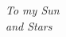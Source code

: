 
\thispagestyle{plain}
\mbox{}

\vspace{2in}

\begin{center}
	{\em
		To my Sun\\
		and Stars
	}
\end{center}
